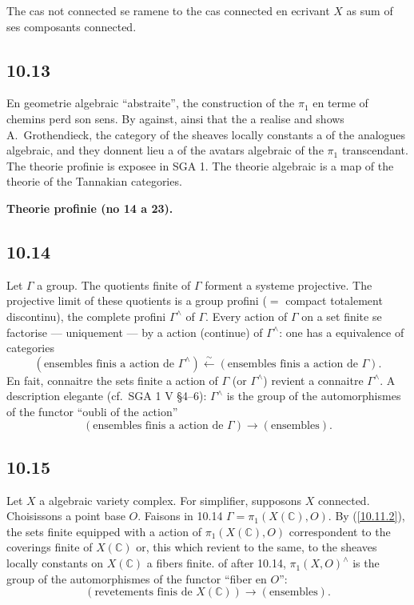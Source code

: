 \documentclass[12pt,a4paper]{article}
\theoremstyle{plain}
\theoremstyle{definition}
\theoremstyle{remark}
\newcommand{\C}{\mathbb{C}}
\begin{document}
The cas not connected se ramene to the cas connected en ecrivant $X$ as sum of ses composants connected.

\subsection*{10.13}

En geometrie algebraic ``abstraite'', the construction of the $\pi_1$ en terme of chemins perd son sens. By against, ainsi that the a realise and shows A.~Grothendieck, the category of the sheaves locally constants a of the analogues algebraic, and they donnent lieu a of the avatars algebraic of the $\pi_1$ transcendant. The theorie profinie is exposee in SGA 1. The theorie algebraic is a map of the theorie of the Tannakian categories.


\textbf{Theorie profinie (no 14 a 23).}

\subsection*{10.14}

Let $\Gamma$ a group. The quotients finite of $\Gamma$ forment a systeme projective. The projective limit of these quotients is a group profini ($=$ compact totalement discontinu), the complete profini $\Gamma^\wedge$ of $\Gamma$. Every action of $\Gamma$ on a set finite se factorise --- uniquement --- by a action (continue) of $\Gamma^\wedge$: one has a equivalence of categories
$$(\text{ensembles finis a action de } \Gamma^\wedge) \xleftarrow{\sim} (\text{ensembles finis a action de } \Gamma).$$
En fait, connaitre the sets finite a action of $\Gamma$ (or $\Gamma^\wedge$) revient a connaitre $\Gamma^\wedge$. A description elegante (cf.~SGA 1 V \S 4--6): $\Gamma^\wedge$ is the group of the automorphismes of the functor ``oubli of the action''
$$(\text{ensembles finis a action de } \Gamma) \longrightarrow (\text{ensembles}).$$

\subsection*{10.15}

Let $X$ a algebraic variety complex. For simplifier, supposons $X$ connected. Choisissons a point base $O$. Faisons in 10.14 $\Gamma = \pi_1(X(\C), O)$. By (\ref{10.11.2}), the sets finite equipped with a action of $\pi_1(X(\C), O)$ correspondent to the coverings finite of $X(\C)$ or, this which revient to the same, to the sheaves locally constants on $X(\C)$ a fibers finite. of after 10.14, $\pi_1(X, O)^\wedge$ is the group of the automorphismes of the functor ``fiber en $O$'':
$$(\text{revetements finis de } X(\C)) \longrightarrow (\text{ensembles}).$$
\end{document}
